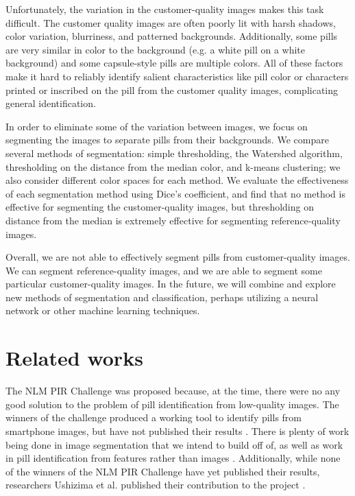 \documentclass{article}
\begin{document}
Unfortunately, the variation in the customer-quality images makes this task difficult. The customer quality images are often poorly lit with harsh shadows, color variation, blurriness, and patterned backgrounds. Additionally, some pills are very similar in color to the background (e.g. a white pill on a white background) and some capsule-style pills are multiple colors. All of these factors make it hard to reliably identify salient characteristics like pill color or characters printed or inscribed on the pill from the customer quality images, complicating general identification.

In order to eliminate some of the variation between images, we focus on segmenting the images to separate pills from their backgrounds. We compare several methods of segmentation: simple thresholding, the Watershed algorithm, thresholding on the distance from the median color, and k-means clustering; we also consider different color spaces for each method. We evaluate the effectiveness of each segmentation method using Dice’s coefficient, and find that no method is effective for segmenting the customer-quality images, but thresholding on distance from the median is extremely effective for segmenting reference-quality images.

Overall, we are not able to effectively segment pills from customer-quality images. We can segment reference-quality images, and we are able to segment some particular customer-quality images. In the future, we will combine and explore new methods of segmentation and classification, perhaps utilizing a neural network or other machine learning techniques.

\section{Related works}
\label{related}

The NLM PIR Challenge was proposed because, at the time, there were no any good solution to the problem of pill identification from low-quality images. The winners of the challenge produced a working tool to identify pills from smartphone images, but have not published their results \cite{fox}. There is plenty of work being done in image segmentation that we intend to build off of, as well as work in pill identification from features rather than images \cite{semantic-segmentation}. Additionally, while none of the winners of the NLM PIR Challenge have yet published their results, researchers Ushizima et al. published their contribution to the project \cite{ushizima}. 
\end{document}
